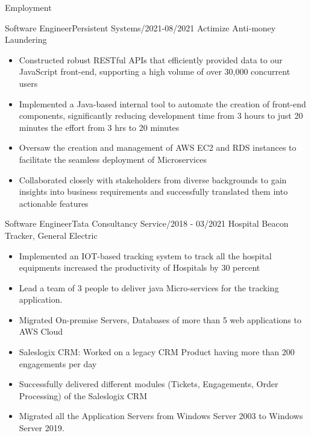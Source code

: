\documentclass[]{mcdowellcv}
\begin{document}
\begin{cvsection}{Employment}
        \begin{cvsubsection}{Software Engineer}{Persistent Systems}{/2021-08/2021}
            Actimize Anti-money Laundering
            \begin{itemize}
                \item Constructed robust RESTful APIs that efficiently provided data to our JavaScript front-end, supporting a high volume of over 30,000 concurrent users
                \item Implemented a Java-based internal tool to automate the creation of front-end components, significantly reducing development time from 3 hours to just 20 minutes
                the effort from 3 hrs to 20 minutes
                \item Oversaw the creation and management of AWS EC2 and RDS instances to facilitate the seamless deployment of Microservices
                \item Collaborated closely with stakeholders from diverse backgrounds to gain insights into business requirements and successfully translated them into actionable features 
            \end{itemize}
        \end{cvsubsection}
        \begin{cvsubsection}{Software Engineer}{Tata Consultancy Service}{/2018 - 03/2021}
            Hospital Beacon Tracker, General Electric
            \begin{itemize}
                \item Implemented an IOT-based tracking system to track all the hospital equipments  increased the productivity of Hospitals by 30 percent
                \item Lead a team of 3 people to deliver java Micro-services for the tracking application.
                \item Migrated On-premise Servers, Databases of more than 5 web applications to AWS Cloud
                \item Saleslogix CRM: Worked on a legacy CRM Product having more than 200 engagements per day
                \item Successfully delivered different modules (Tickets, Engagements, Order Processing) of the Saleslogix CRM
                \item Migrated all the Application Servers from Windows Server 2003 to Windows Server 2019.
            \end{itemize}
        \end{cvsubsection}
    \end{cvsection}
\end{document}
